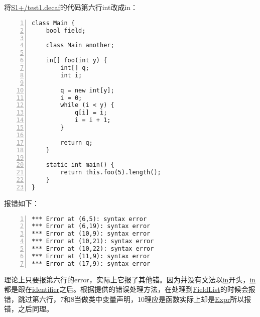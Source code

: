 \documentclass[a4paper]{article}
\begin{document}
\section{}
将\uline{S1+/test1.decaf}的代码第六行int改成in：
\begin{lstlisting}[basicstyle=\ttfamily\small, numbers=left, frame=shadowbox, rulesepcolor=\color{red!20!green!20!blue!20},extendedchars=true,breaklines=true]
class Main {
    bool field;

    class Main another;

    in[] foo(int y) {
        int[] q;
        int i;

        q = new int[y];
        i = 0;
        while (i < y) {
            q[i] = i;
            i = i + 1;
        }

        return q;
    }

    static int main() {
        return this.foo(5).length();    
    }
}
\end{lstlisting}
报错如下：
\begin{lstlisting}[basicstyle=\ttfamily\small, numbers=left, frame=shadowbox, rulesepcolor=\color{red!20!green!20!blue!20},extendedchars=true,breaklines=true]
*** Error at (6,5): syntax error
*** Error at (6,19): syntax error
*** Error at (10,9): syntax error
*** Error at (10,21): syntax error
*** Error at (10,22): syntax error
*** Error at (11,9): syntax error
*** Error at (17,9): syntax error
\end{lstlisting}
理论上只要报第六行的error，实际上它报了其他错。因为并没有文法以\uline{in}开头，\uline{in}都是跟在\uline{identifier}之后。根据提供的错误处理方法，在处理到\uline{FieldList}的时候会报错，跳过第六行，7和8当做类中变量声明，10理应是函数实际上却是\uline{Expr}所以报错，之后同理。
\end{document}
